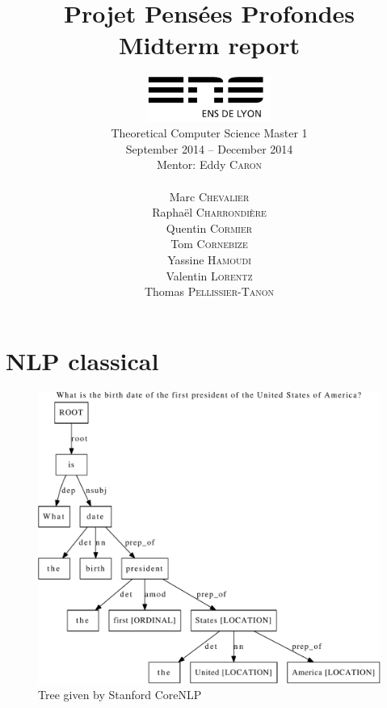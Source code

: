 \documentclass[a4paper,10pt]{report}
\title{Projet Pensées Profondes\\\large Midterm report}
\author{\includegraphics[width=0.3\textwidth]{../logo_ensl.png}\\[50pt]
Theoretical Computer Science Master 1\\September 2014 \--- December 2014\\[50pt]
Mentor: Eddy \textsc{Caron}\\[50pt]
\begin{minipage}{0.4\textwidth}
    \begin{flushleft} \large
        Marc \textsc{Chevalier}
        \\
        Raphaël \textsc{Charrondière}
        \\
        Quentin \textsc{Cormier}
        \\
        Tom \textsc{Cornebize}
    \end{flushleft}
\end{minipage}
\begin{minipage}{0.4\textwidth}
    \begin{flushright} \large
        Yassine \textsc{Hamoudi}
        \\
        Valentin \textsc{Lorentz}
        \\
        Thomas \textsc{Pellissier-Tanon}
        \\
    \end{flushright}
\end{minipage}
}
\date{}
\begin{document}
\maketitle



\tableofcontents



















\appendix

\chapter{NLP classical}
\begin{figure}
\includegraphics[scale=0.6]{../examples_NLP_classical/before_simplification.pdf}
\caption{Tree given by Stanford CoreNLP}
\label{tree_before}
\end{figure}
\end{document}
